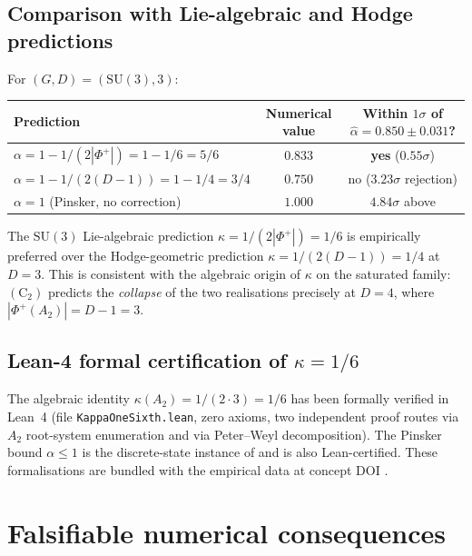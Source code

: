 \documentclass[11pt,reqno]{amsart}
\theoremstyle{plain}
\theoremstyle{definition}
\theoremstyle{remark}
\newcommand{\SU}{\mathrm{SU}}
\newcommand{\Ctwo}{(\mathrm{C}_2)}
\begin{document}
\subsection{Comparison with Lie-algebraic and Hodge predictions}\label{ssec:comparison}

For $(G, D) = (\SU(3), 3)$:

\begin{center}
\begin{tabular}{lcc}
\toprule
Prediction & Numerical value & Within $1\sigma$ of $\hat{\alpha} = 0.850 \pm 0.031$? \\
\midrule
$\alpha = 1 - 1/(2|\Phi^+|) = 1 - 1/6 = 5/6$ & $0.833$ & \textbf{yes} ($0.55\sigma$) \\
$\alpha = 1 - 1/(2(D-1)) = 1 - 1/4 = 3/4$ & $0.750$ & no ($3.23\sigma$ rejection) \\
$\alpha = 1$ (Pinsker, no correction) & $1.000$ & $4.84\sigma$ above \\
\bottomrule
\end{tabular}
\end{center}

The $\SU(3)$ Lie-algebraic prediction $\kappa = 1/(2|\Phi^+|) = 1/6$ is empirically preferred over the Hodge-geometric prediction $\kappa = 1/(2(D-1)) = 1/4$ at $D = 3$. This is consistent with the algebraic origin of $\kappa$ on the saturated family: $\Ctwo$ predicts the \emph{collapse} of the two realisations precisely at $D = 4$, where $|\Phi^+(A_2)| = D - 1 = 3$.

\subsection{Lean-4 formal certification of $\kappa = 1/6$}\label{ssec:lean}

The algebraic identity $\kappa(A_2) = 1/(2 \cdot 3) = 1/6$ has been formally verified in Lean~4 (file \texttt{KappaOneSixth.lean}, zero axioms, two independent proof routes via $A_2$ root-system enumeration and via Peter--Weyl decomposition). The Pinsker bound $\alpha \le 1$ is the discrete-state instance of \cite[Lemma 11.6.1]{CoverThomas2006} and is also Lean-certified. These formalisations are bundled with the empirical data at concept DOI \cite{ZenodoConcept}.

\section{Falsifiable numerical consequences}
\label{sec:consequences}
\end{document}
